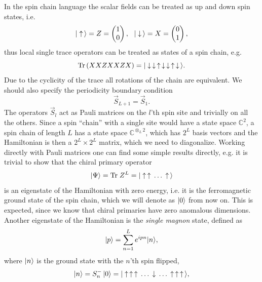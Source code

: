 In the spin chain language the scalar fields can be treated as up and down spin states, i.e.
\begin{equation}
	|\uparrow\,\rangle = Z = \left( \begin{matrix} 1 \\ 0 \end{matrix} \right), \,\,\,\, |\downarrow\,\rangle = X = \left( \begin{matrix} 0 \\ 1 \end{matrix} \right),
\end{equation}
thus local single trace operators can be treated as states of a spin chain, e.g.
\begin{equation}
	\mathrm{Tr} \left( XXZXXZX \right) = |\downarrow \, \downarrow \, \uparrow \, \downarrow \, \downarrow \, \uparrow \, \downarrow \,\rangle.
\end{equation}
Due to the cyclicity of the trace all rotations of the chain are equivalent. 
We should also specify the periodicity boundary condition
\begin{equation}
	\vec{S}_{L+1} = \vec{S}_1.
\end{equation}
The operators $\vec{S}_l$ act as Pauli matrices on the $l$'th spin site and trivially on all the others. 
Since a spin ``chain'' with a single site would have a state space $\mathbb{C}^2$, a spin chain of length $L$ has a state space $\mathbb{C}^{\otimes_L 2}$, which has $2^L$ basis vectors and the Hamiltonian is then a $2^L \times 2^L$ matrix, which we need to diagonalize. 
Working directly with Pauli matrices one can find some simple results directly, e.g. it is trivial to show that the chiral primary operator
\begin{equation}
	|\Psi\rangle = \mathrm{Tr} \; Z^L = |\uparrow \, \uparrow \, \dots \, \uparrow \,\rangle
\end{equation}
is an eigenstate of the Hamiltonian with zero energy, i.e. it is the ferromagnetic ground state of the spin chain, which we will denote as $|0\rangle$ from now on. 
This is expected, since we know that chiral primaries have zero anomalous dimensions. 
Another eigenstate of the Hamiltonian is the \emph{single magnon} state, defined as
\begin{equation}
	|p\rangle = \sum_{n=1}^L e^{ipn} |n\rangle,
\end{equation} 
where $|n\rangle$ is the ground state with the $n$'th spin flipped,
\begin{equation}
	|n\rangle = S^-_n \, |0\rangle = |\uparrow \, \uparrow \, \uparrow \, \dots \, \downarrow \, \dots \, \uparrow \, \uparrow \, \uparrow \,\rangle,
\end{equation}
